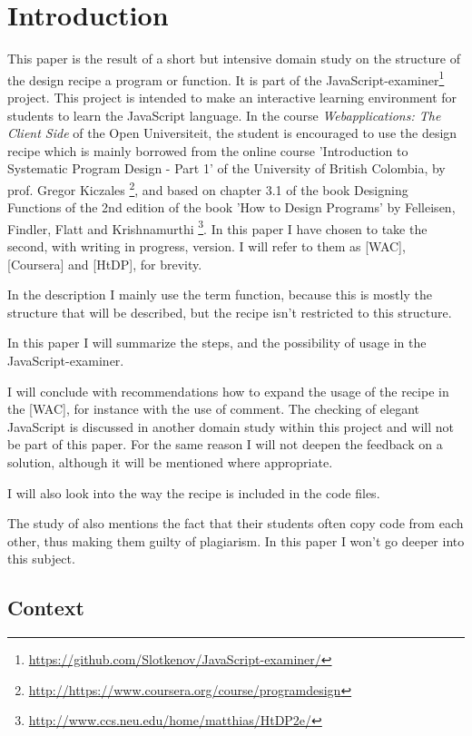 \section{Introduction}

This paper is the result of a short but intensive domain study on the  structure
of the design recipe a program or function.
It is part of the JavaScript-examiner\footnote{\url{https://github.com/Slotkenov/JavaScript-examiner/}} project.
This project is intended to make an interactive learning environment for students
to learn the JavaScript language. 
In the course {\em Webapplications: The Client Side} of the Open Universiteit,
the student is encouraged to use the design recipe which is mainly borrowed from
the online course 'Introduction to Systematic Program Design - Part 1'
of the University of British Colombia, by prof. Gregor Kiczales
\footnote{\url{http://https://www.coursera.org/course/programdesign}},
and based on chapter 3.1 of the book Designing Functions of the 2nd edition of the book
'How to Design Programs' by Felleisen, Findler, Flatt and Krishnamurthi
\footnote{\url{http://www.ccs.neu.edu/home/matthias/HtDP2e/}}.
In this paper I have chosen to take the second, with writing in progress, version.
I will refer to them as [WAC], [Coursera] and [HtDP], for brevity.

In the description I mainly use the term function, because this is mostly
the structure that will be described, but the recipe isn't restricted to this
structure.

In this paper I will summarize the steps, and the possibility of usage in the 
JavaScript-examiner.

I will conclude with recommendations how to expand the usage of the recipe in
the [WAC], for instance with the use of comment.
The checking of elegant JavaScript is discussed in another domain study within
this project and will not be part of this paper.
For the same reason I will not deepen the feedback on a solution, although
it will be mentioned where appropriate.

I will also look into the way the recipe is included in the code files.

The study of \citet{bieniusa2008htdp} also mentions the fact that their students
often copy code from
each other, thus making them guilty of plagiarism.
In this paper I won't go deeper into this subject.


\subsection{Context}

